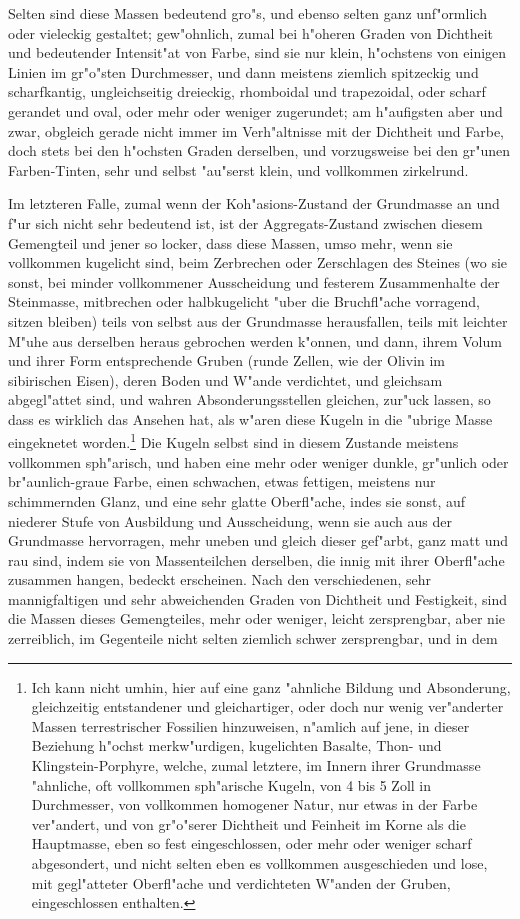 \documentclass[a4paper, 11pt, oneside, german]{article}
\begin{document}
Selten sind diese Massen bedeutend gro"s, und ebenso selten ganz unf"ormlich oder vieleckig gestaltet; gew"ohnlich, zumal bei h"oheren Graden von Dichtheit und bedeutender Intensit"at von Farbe, sind sie nur klein, h"ochstens von einigen Linien im gr"o"sten Durchmesser, und dann meistens ziemlich spitzeckig und scharfkantig, ungleichseitig dreieckig, rhomboidal und trapezoidal, oder scharf gerandet und oval, oder mehr oder weniger zugerundet; am h"aufigsten aber und zwar, obgleich gerade nicht immer im Verh"altnisse mit der Dichtheit und Farbe, doch stets bei den h"ochsten Graden derselben, und vorzugsweise bei den gr"unen Farben-Tinten, sehr und selbst "au"serst klein, und vollkommen zirkelrund.

Im letzteren Falle, zumal wenn der Koh"asions-Zustand der Grundmasse an und f"ur sich nicht sehr bedeutend ist, ist der Aggregats-Zustand zwischen diesem Gemengteil und jener so locker, dass diese Massen, umso mehr, wenn sie vollkommen kugelicht sind, beim Zerbrechen oder Zerschlagen des Steines (wo sie sonst, bei minder vollkommener Ausscheidung und festerem Zusammenhalte der Steinmasse, mitbrechen oder halbkugelicht "uber die Bruchfl"ache vorragend, sitzen bleiben) teils von selbst aus der Grundmasse herausfallen, teils mit leichter M"uhe aus derselben heraus gebrochen werden k"onnen, und dann, ihrem Volum und ihrer Form entsprechende Gruben (runde Zellen, wie der Olivin im sibirischen Eisen), deren Boden und W"ande verdichtet, und gleichsam abgegl"attet sind, und wahren Absonderungsstellen gleichen, zur"uck lassen, so dass es wirklich das Ansehen hat, als w"aren diese Kugeln in die "ubrige Masse eingeknetet worden.\footnote{Ich kann nicht umhin, hier auf eine ganz "ahnliche Bildung und Absonderung, gleichzeitig entstandener und gleichartiger, oder doch nur wenig ver"anderter Massen terrestrischer Fossilien hinzuweisen, n"amlich auf jene, in dieser Beziehung h"ochst merkw"urdigen, kugelichten Basalte, Thon- und Klingstein-Porphyre, welche, zumal letztere, im Innern ihrer Grundmasse "ahnliche, oft vollkommen sph"arische Kugeln, von 4 bis 5 Zoll in Durchmesser, von vollkommen homogener Natur, nur etwas in der Farbe ver"andert, und von gr"o"serer Dichtheit und Feinheit im Korne als die Hauptmasse, eben so fest eingeschlossen, oder mehr oder weniger scharf abgesondert, und nicht selten eben es vollkommen ausgeschieden und lose, mit gegl"atteter Oberfl"ache und verdichteten W"anden der Gruben, eingeschlossen enthalten.} Die Kugeln selbst sind in diesem Zustande meistens vollkommen sph"arisch, und haben eine mehr oder weniger dunkle, gr"unlich oder br"aunlich-graue Farbe, einen schwachen, etwas fettigen, meistens nur schimmernden Glanz, und eine sehr glatte Oberfl"ache, indes sie sonst, auf niederer Stufe von Ausbildung und Ausscheidung, wenn sie auch aus der Grundmasse hervorragen, mehr uneben und gleich dieser gef"arbt, ganz matt und rau sind, indem sie von Massenteilchen derselben, die innig mit ihrer Oberfl"ache zusammen hangen, bedeckt erscheinen. Nach den verschiedenen, sehr mannigfaltigen und sehr abweichenden Graden von Dichtheit und Festigkeit, sind die Massen dieses Gemengteiles, mehr oder weniger, leicht zersprengbar, aber nie zerreiblich, im Gegenteile nicht selten ziemlich schwer zersprengbar, und in dem 
\end{document}
